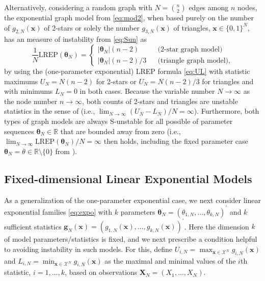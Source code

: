 \documentclass[numbib]{imamat}
\theoremstyle{theorem}
\theoremstyle{lemma}
\theoremstyle{example}
\theoremstyle{corollary}
\theoremstyle{definition}
\theoremstyle{remark}
\theoremstyle{approximation}
\theoremstyle{scheme}
\newcommand{\REP}{\mathrm{LREP}}
\begin{document}
Alternatively, considering a random graph with \(N={n \choose 2}\) edges
among \(n\) nodes, the exponential graph model from \eqref{eq:mod2}, when
based purely on the number of \(g_{2,N}(\boldsymbol x)\) of 2-stars or
solely the number \(g_{3,N}(\boldsymbol x)\) of triangles,
\(\boldsymbol x\in\{0,1\}^N\), has an measure of instability from
\eqref{eq:Sun} as \[
\frac{1}{N}\REP(\boldsymbol \theta_N )  = \left\{ \begin{array}{lcl} |\boldsymbol \theta_N| (n-2) && \text{(2-star graph model)}\\
|\boldsymbol \theta_N|(n-2)/3 &&\text{(triangle graph model)},\end{array}\right.
\] by using the (one-parameter exponential) LREP formula \eqref{eq:UL}
with statistic maximums \(U_N= N(n-2)\) for 2-stars or \(U_N= N(n-2)/3\)
for triangles and with minimums \(L_N=0\) in both cases. Because the
variable number \(N\to \infty\) as the node number \(n\to \infty\), both
counts of 2-stars and triangles are unstable statistics in the sense of
\citet{schweinberger2011instability} (i.e.,
\(\lim_{N\to \infty} (U_N-L_N)/N=\infty\)). Furthermore, both types of
graph models are always S-unstable for all possible of parameter
sequences \(\boldsymbol \theta_N \in\mathbb{R}\) that are bounded away
from zero (i.e.,
\(\lim_{N\to \infty}\REP(\boldsymbol \theta_N )/N=\infty\) then holds,
including the fixed parameter case
\(\boldsymbol \theta_N=\theta\in\mathbb{R}\setminus \{0\}\) from
\citet{schweinberger2011instability}).

\hypertarget{fixed-dim-exp}{%
\subsection{Fixed-dimensional Linear Exponential
Models}\label{fixed-dim-exp}}

As a generalization of the one-parameter exponential case, we next
consider linear exponential families \eqref{eq:expo} with \(k\) parameters
\(\boldsymbol \theta_N = (\theta_{1,N},\ldots,\theta_{k,N})^\prime\) and
\(k\) sufficient statistics
\(\boldsymbol g_N(\boldsymbol x) = (g_{1,N}(\boldsymbol x),\ldots, g_{k,N}(\boldsymbol x))^\prime\).
Here the dimension \(k\) of model parameters/statistics is fixed, and we
next prescribe a condition helpful to avoiding instability in such
models. For this, define
\(U_{i,N}=\max_{\boldsymbol x \in\mathcal{X}^N} g_{i,N}(\boldsymbol x)\)
and
\(L_{i,N}=\min_{\boldsymbol x \in\mathcal{X}^N} g_{i,N}(\boldsymbol x)\)
as the maximal and minimal values of the \(i\)th statistic,
\(i=1,\ldots,k\), based on observations
\(\boldsymbol X_N=(X_1,\ldots,X_N)\).
\end{document}
